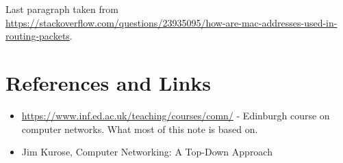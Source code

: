 \documentclass{article}
\begin{document}
Last paragraph taken from \\
\url{https://stackoverflow.com/questions/23935095/how-are-mac-addresses-used-in-routing-packets}.


\section{References and Links}
\begin{itemize}
    \item \url{https://www.inf.ed.ac.uk/teaching/courses/comn/} - Edinburgh course on computer networks. What most of this note is based on.
    \item Jim Kurose, Computer Networking: A Top-Down Approach
\end{itemize}
\end{document}
